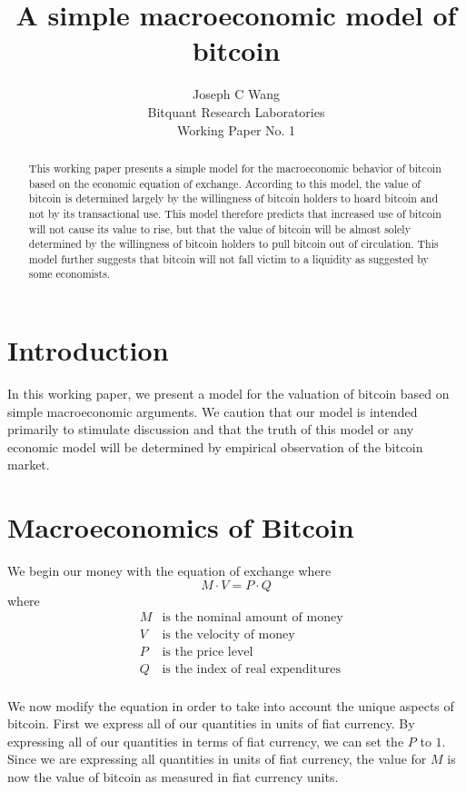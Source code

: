 \documentclass[12pt]{article}
\title{A simple macroeconomic model of bitcoin}
\author{Joseph C Wang\\
\small Bitquant Research Laboratories\\
\small Working Paper No. 1}
\begin{document}
\maketitle
\begin{abstract}
This working paper presents a simple model for the macroeconomic
behavior of bitcoin based on the economic equation of exchange.
According to this model, the value of bitcoin is determined largely by
the willingness of bitcoin holders to hoard bitcoin and not by its
transactional use.  This model therefore predicts that increased use
of bitcoin will not cause its value to rise, but that the value of
bitcoin will be almost solely determined by the willingness of bitcoin
holders to pull bitcoin out of circulation.  This model further
suggests that bitcoin will not fall victim to a liquidity as suggested
by some economists.
\end{abstract}

\section{Introduction} 

In this working paper, we present a model for the valuation of bitcoin
based on simple macroeconomic arguments.  We caution that our model is
intended primarily to stimulate discussion and that the truth of this
model or any economic model will be determined by empirical
observation of the bitcoin market.

\section{Macroeconomics of Bitcoin}

We begin our money with the equation of exchange where
\begin{equation}
M \cdot V = P \cdot Q
\end{equation}
where
\begin{eqnarray*}
& M & \mbox{is the nominal amount of money}\\
& V & \mbox{is the velocity of money}\\
& P & \mbox{is the price level}\\
& Q & \mbox{is the index of real expenditures}\\
\end{eqnarray*}

We now modify the equation in order to take into account the unique
aspects of bitcoin.  First we express all of our quantities in units
of fiat currency.  By expressing all of our quantities in terms of
fiat currency, we can set the $P$ to $1$.  Since we are expressing all
quantities in units of fiat currency, the value for $M$ is now the
value of bitcoin as measured in fiat currency units.
\end{document}
